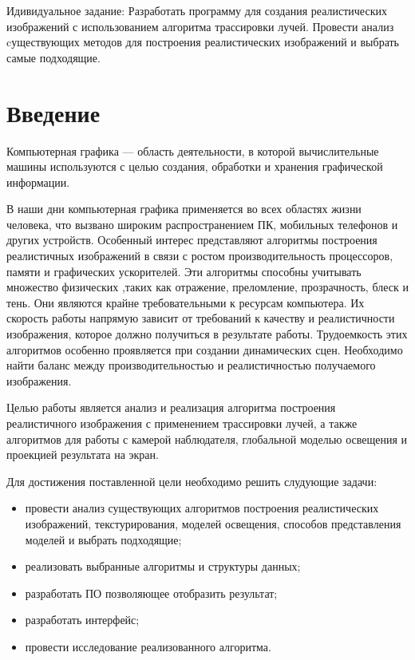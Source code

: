 \documentclass[12pt,a4paper,oneside]{report}
\begin{document}
\thispagestyle{empty}	
\newpage

\noindent Идивидуальное задание:\newline
Разработать программу для создания реалистических изображений с использованием алгоритма трассировки лучей. Провести анализ cуществующих методов для построения реалистических изображений и выбрать самые подходящие.
	
	
	\tableofcontents
	\chapter*{Введение}
		\quad Компьютерная графика — область деятельности, в которой вычислительные машины 	используются с целью создания, обработки и хранения графической информации.
		
		 В наши дни компьютерная графика применяется во всех областях жизни человека, что вызвано широким распространением ПК, мобильных телефонов и других устройств. Особенный интерес представляют алгоритмы построения реалистичных изображений в связи с ростом производительность процессоров, памяти и графических ускорителей. Эти алгоритмы способны учитывать множество физических ,таких как отражение, преломление, прозрачность, блеск и тень. Они являются крайне требовательными к ресурсам компьютера. Их скорость работы напрямую зависит от требований к качеству и реалистичности изображения, которое должно получиться в результате работы. Трудоемкость этих алгоритмов особенно проявляется при создании динамических сцен. Необходимо найти баланс между производительностью и реалистичностью получаемого изображения.
		
		Целью работы является анализ и реализация алгоритма построения реалистичного изображения с применением трассировки лучей, а также алгоритмов для работы с камерой наблюдателя, глобальной моделью освещения и проекцией результата на экран.
		
		Для достижения поставленной цели необходимо решить слудующие задачи:
		\begin{itemize}
			\item провести анализ существующих алгоритмов построения реалистических изображений, текстурирования, моделей освещения, способов представления моделей и выбрать подходящие;
    		\item реализовать выбранные алгоритмы и структуры данных;
    		\item разработать ПО позволяющее отобразить результат;
    		\item разработать интерфейс;
    		\item провести исследование реализованного алгоритма.
    	\end{itemize}
    	
\end{document}

